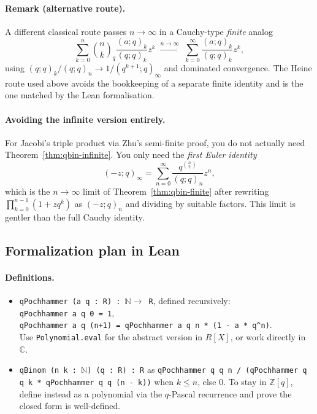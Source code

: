 \paragraph{Remark (alternative route).} A different classical route passes
$n \to \infty$ in a Cauchy-type \emph{finite} analog
\[
  \sum_{k=0}^n \binom{n}{k}_q \frac{(a;q)_k}{(q;q)_k} z^k
  \;\xrightarrow{n \to \infty}\;
  \sum_{k=0}^\infty \frac{(a;q)_k}{(q;q)_k} z^k,
\]
using $(q;q)_k / (q;q)_n \to 1/(q^{k+1};q)_\infty$ and dominated convergence.
The Heine route used above avoids the bookkeeping of a separate finite identity
and is the one matched by the Lean formalisation.

\paragraph{Avoiding the infinite version entirely.}
For Jacobi's triple product via Zhu's semi-finite proof, you do not actually need Theorem~\ref{thm:qbin-infinite}. You only need the \emph{first Euler identity}
\[
(-z; q)_\infty = \sum_{n=0}^\infty \frac{q^{\binom{n}{2}}}{(q; q)_n} z^n,
\]
which is the $n \to \infty$ limit of Theorem~\ref{thm:qbin-finite} after rewriting $\prod_{k=0}^{n-1}(1 + zq^k)$ as $(-z; q)_n$ and dividing by suitable factors. This limit is gentler than the full Cauchy identity.

\subsection{Formalization plan in Lean}

\paragraph{Definitions.}
\begin{itemize}\item \texttt{qPochhammer (a q : R) : $\mathbb{N} \to$ R}, defined recursively: \\
\texttt{qPochhammer a q 0 = 1}, \\
\texttt{qPochhammer a q (n+1) = qPochhammer a q n * (1 - a * q\^{}n)}. \\
Use \texttt{Polynomial.eval} for the abstract version in $R[X]$, or work directly in $\mathbb{C}$.
\item \texttt{qBinom (n k : $\mathbb{N}$) (q : R) : R} as \texttt{qPochhammer q q n / (qPochhammer q q k * qPochhammer q q (n - k))} when $k \leq n$, else 0. To stay in $\mathbb{Z}[q]$, define instead as a polynomial via the $q$-Pascal recurrence and prove the closed form is well-defined.
\end{itemize}

